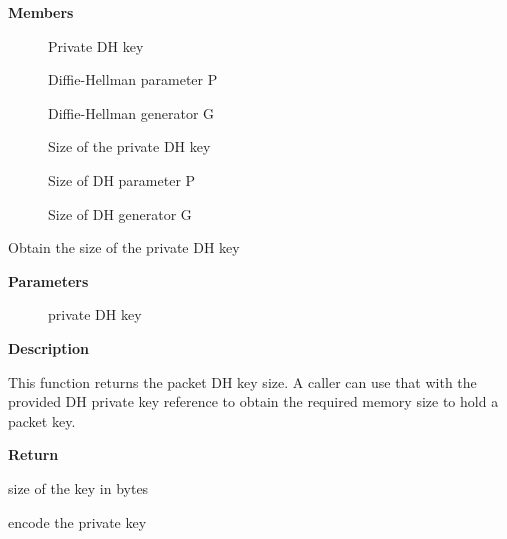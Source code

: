 \documentclass[a4paper,8pt,english]{sphinxmanual}
\begin{document}
\textbf{Members}
\begin{description}
\item[{}] \leavevmode
Private DH key

\item[{}] \leavevmode
Diffie-Hellman parameter P

\item[{}] \leavevmode
Diffie-Hellman generator G

\item[{}] \leavevmode
Size of the private DH key

\item[{}] \leavevmode
Size of DH parameter P

\item[{}] \leavevmode
Size of DH generator G

\end{description}

\begin{fulllineitems}
\label{crypto/api-kpp:c.crypto_dh_key_len}
Obtain the size of the private DH key

\end{fulllineitems}


\textbf{Parameters}
\begin{description}
\item[{}] \leavevmode
private DH key

\end{description}

\textbf{Description}

This function returns the packet DH key size. A caller can use that
with the provided DH private key reference to obtain the required
memory size to hold a packet key.

\textbf{Return}

size of the key in bytes

\begin{fulllineitems}
\label{crypto/api-kpp:c.crypto_dh_encode_key}
encode the private key

\end{fulllineitems}
\end{document}
